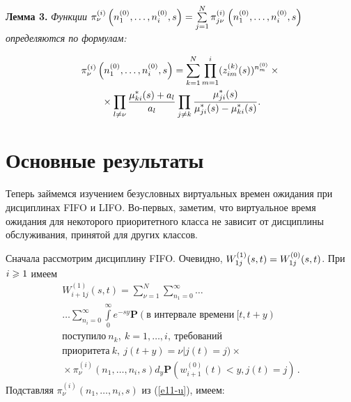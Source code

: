 \begin{multicols}{2}
\noindent
\textbf{Лемма 3.} \textit{Функции  $\pi_{\nu}^{(i)}\left(n_1^{(0)},\ldots,n_i^{(0)},s\right)
\hm=\sum\limits_{j=1}^N \pi_{j\nu}^{(i)}\left(n_1^{(0)},\ldots,n_i^{(0)},s\right)$ определяются по фор\-мулам:}

\noindent
\begin{multline}
\label{e11-u}
\pi_{\nu}^{(i)}\left(n_1^{(0)},\ldots,n_i^{(0)},s\right)=
\sum\limits_{k=1}^N\prod\limits_{m=1}^i (z_{im}^{(k)}(s))^{n_m^{(0)}}\times{}\\
{}\times
\prod_{l\ne \nu}\displaystyle\frac{\displaystyle \mu_{ki}^{*}(s)+a_l\mathstrut}{\displaystyle a_l\mathstrut}\prod_{j\ne k}\displaystyle\frac{\displaystyle \mu_{ji}^{*}(s)\mathstrut}{\displaystyle \mu_{ji}^{*}(s)-\mu_{ki}^{*}(s)\mathstrut}.
\end{multline}


\section{Основные результаты}

Теперь займемся изучением безусловных виртуальных времен ожидания 
при дисциплинах FIFO и LIFO. Во-пер\-вых, заметим, что виртуальное время
ожидания для некоторого приоритетного класса не зависит от дисциплины обслуживания, 
принятой для других классов.

Сначала рассмотрим дисциплину
FIFO. Очевидно, $W_{1j}^{(1)}(s,t)\hm=W_{1j}^{(0)}(s,t)$. При $i\hm\geqslant 1$ имеем
\begin{multline*}
W_{i+1j}^{(1)}(s,t)=
\sum\limits_{\nu=1}^N\sum\limits_{n_1=0}^{\infty}\ldots\\
\ldots\sum\limits_{n_i=0}^{\infty}\int\limits_0^{\infty}
e^{-sy}\mathbf{P}(\mbox{в интервале времени}\ [t,t+y)\\
 \mbox{поступило}\ n_k,\:k=1,\ldots,i,\ \mbox{требований}\\
 \mbox{приоритета}\ k, \ j(t+y)=\nu|j(t)=j)\times{}\\
 {}\times\pi_{\nu}^{(i)}\left(n_1,\ldots,n_i,s\right)d_y
 \mathbf{P}(w_{i+1}^{(0)}(t)<y,j(t)=j)\,.
\end{multline*}
Подставляя $\pi_{\nu}^{(i)}\left(n_1,\ldots,n_i,s\right)$ из (\ref{e11-u}), имеем:


\end{multicols}

